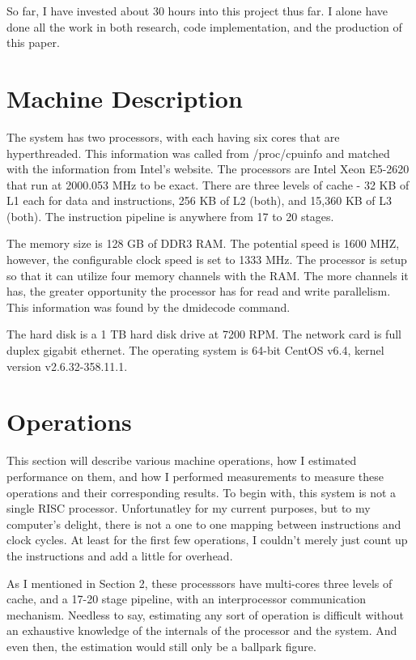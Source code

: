 \documentclass[paper=a4, fontsize=11pt]{scrartcl}
\numberwithin{equation}{section}        %
\numberwithin{figure}{section}          %
\numberwithin{table}{section}               %
\begin{document}
So far, I have invested about 30 hours into this project thus far.  I alone have done all the work in both research, code implementation, and the production of this paper.

\section{Machine Description}

The system has two processors, with each having six cores that are hyperthreaded.  This information was called from /proc/cpuinfo and matched with the information from Intel's website.  The processors are Intel Xeon E5-2620 that run at 2000.053 MHz to be exact.  There are three levels of cache - 32 KB of L1 each for data and instructions, 256 KB of L2 (both), and 15,360 KB of L3 (both).  The instruction pipeline is anywhere from 17 to 20 stages.

The memory size is 128 GB of DDR3 RAM.  The potential speed is 1600 MHZ, however, the configurable clock speed is set to 1333 MHz.  The processor is setup so that it can utilize four memory channels with the RAM.  The more channels it has, the greater opportunity the processor has for read and write parallelism.  This information was found by the dmidecode command.

The hard disk is a 1 TB hard disk drive at 7200 RPM.  The network card is full duplex gigabit ethernet.  The operating system is 64-bit CentOS v6.4, kernel version v2.6.32-358.11.1.

\section{Operations}
This section will describe various machine operations, how I estimated performance on them, and how I performed measurements to measure these operations and their corresponding results.  To begin with, this system is not a single RISC processor.  Unfortunatley for my current purposes, but to my computer's delight, there is not a one to one mapping between instructions and clock cycles.  At least for the first few operations, I couldn't merely just count up the instructions and add a little for overhead.

As I mentioned in Section 2, these processsors have multi-cores three levels of cache, and a 17-20 stage pipeline, with an interprocessor communication mechanism.  Needless to say, estimating any sort of operation is difficult without an exhaustive knowledge of the internals of the processor and the system.  And even then, the estimation would still only be a ballpark figure.
\end{document}
